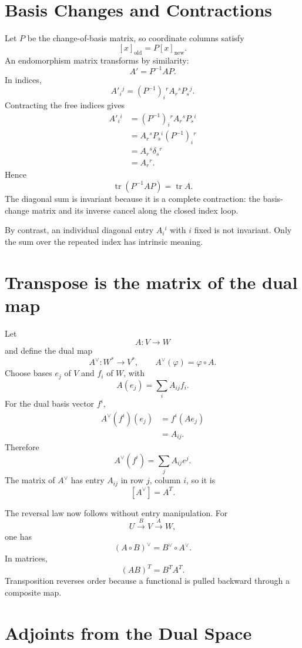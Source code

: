 \section{Basis Changes and Contractions}

Let \(P\) be the change-of-basis matrix, so coordinate columns satisfy
\[
  [x]_{\mathrm{old}}=P[x]_{\mathrm{new}}.
\]
An endomorphism matrix transforms by similarity:
\[
  A'=P^{-1}AP.
\]
In indices,
\[
  A'_i{}^{j}
  =(P^{-1})_i{}^{r}
   A_r{}^{s}P_s{}^{j}.
\]
Contracting the free indices gives
\[
\begin{aligned}
  A'_i{}^{i}
  &=(P^{-1})_i{}^{r}
    A_r{}^{s}P_s{}^{i}\\
  &=A_r{}^{s}
    P_s{}^{i}(P^{-1})_i{}^{r}\\
  &=A_r{}^{s}\delta_s{}^{r}\\
  &=A_r{}^{r}.
\end{aligned}
\]
Hence
\[
  \operatorname{tr}(P^{-1}AP)
  =\operatorname{tr}A.
\]
The diagonal sum is invariant because it is a complete contraction: the basis-change matrix and its inverse cancel along the closed index loop.

By contrast, an individual diagonal entry \(A_i{}^i\) with \(i\) fixed is not invariant.  Only the sum over the repeated index has intrinsic meaning.

\section{Transpose is the matrix of the dual map}

Let
\[
  A:V\to W
\]
and define the dual map
\[
  A^\vee:W^*\to V^*,
  \qquad
  A^\vee(\varphi)=\varphi\circ A.
\]
Choose bases \(e_j\) of \(V\) and \(f_i\) of \(W\), with
\[
  A(e_j)=\sum_i A_{ij}f_i.
\]
For the dual basis vector \(f^i\),
\[
\begin{aligned}
  A^\vee(f^i)(e_j)
  &=f^i(Ae_j)\\
  &=A_{ij}.
\end{aligned}
\]
Therefore
\[
  A^\vee(f^i)=\sum_jA_{ij}e^j.
\]
The matrix of \(A^\vee\) has entry \(A_{ij}\) in row \(j\), column \(i\), so it is
\[
  [A^\vee]=A^T.
\]

The reversal law now follows without entry manipulation.  For
\[
  U\xrightarrow{B}V\xrightarrow{A}W,
\]
one has
\[
  (A\circ B)^\vee
  =B^\vee\circ A^\vee.
\]
In matrices,
\[
  (AB)^T=B^TA^T.
\]
Transposition reverses order because a functional is pulled backward through a composite map.

\section{Adjoints from the Dual Space}

